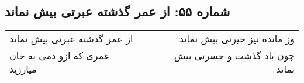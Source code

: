 \begin{center}
\section*{شماره ۵۵: از عمر گذشته عبرتی بیش نماند}
\label{sec:055}
\begin{longtable}{l p{0.5cm} r}
از عمر گذشته عبرتی بیش نماند
&&
وز مانده نیز حیرتی بیش نماند
\\
عمری که ازو دمی به جان میارزید
&&
چون باد گذشت و حسرتی بیش نماند
\\
\end{longtable}
\end{center}
